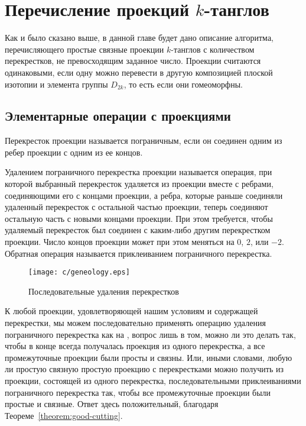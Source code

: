 \newpage
\section{Перечисление проекций $k$-танглов}
	\label{section:projections}

		Как и было сказано выше, в данной главе будет дано описание алгоритма, перечисляющего простые связные проекции
		$k$-танглов с количеством перекрестков, не превосходящим заданное число. Проекции считаются одинаковыми, если
		одну можно перевести в другую композицией плоской изотопии и элемента группы $D_{2k}$, то есть если они гомеоморфны.

	\subsection{Элементарные операции с проекциями}
		\label{subsection:cutting}

		\begin{definition}
			Перекресток проекции называется пограничным, если он соединен одним из ребер проекции с одним из ее концов.
		\end{definition}

		\begin{definition}
			Удалением пограничного перекрестка проекции называется операция, при которой выбранный перекресток
			удаляется из проекции вместе с ребрами, соединяющими его с концами проекции, а ребра, которые раньше
			соединяли удаленный перекресток с остальной частью проекции, теперь соединяют остальную часть с новыми
			концами проекции. При этом требуется, чтобы удаляемый перекресток был соединен с каким-либо другим
			перекрестком проекции. Число концов проекции может при этом меняться на $0$, $2$, или $-2$. Обратная
			операция называется приклеиванием пограничного перекрестка. 
		\end{definition}

		\begin{figure}[ht]
			\centering
			\texttt{[image: c/geneology.eps]}
			\caption{Последовательные удаления перекрестков\label{figure:geneology}}
		\end{figure}

		К любой проекции, удовлетворяющей нашим условиям и содержащей перекрестки, мы можем последовательно применять операцию
		удаления пограничного перекрестка как на , вопрос лишь в том, можно ли это делать так,
		чтобы в конце всегда получалась проекция из одного перекрестка, а все промежуточные проекции были просты и связны.
		Или, иными словами, любую ли простую связную простую проекцию с перекрестками можно получить из проекции, состоящей
		из одного перекрестка, последовательными приклеиваниями пограничного перекрестка так, чтобы все промежуточные проекции
		были простые и связные. Ответ здесь положительный, благодаря Теореме~\ref{theorem:good-cutting}.

